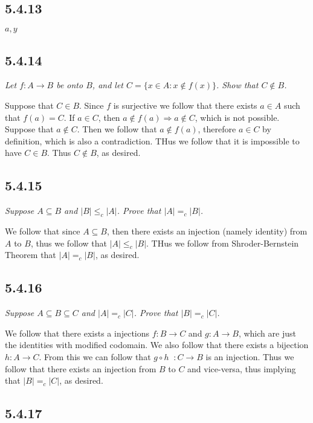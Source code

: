 \documentclass[11pt,oneside,titlepage]{book}
\DeclareMathOperator \inv {^{-1}}
\DeclareMathOperator \ra {\Rightarrow}
\begin{document}
\subsection*{5.4.13}

$a, y$

\subsection*{5.4.14}

\textit{Let $f: A \to B$ be onto $B$, and let $C = \{x \in A: x \notin f(x)\}$. Show that
  $C \notin B$.}

Suppose that $C \in B$. Since $f$ is surjective we follow that there exists $a \in A$
such that $f(a) = C$. If $a \in C$, then $a \notin f(a) \ra a \notin C$, which is not possible.
Suppose that $a \notin C$. Then we follow that $a \notin f(a)$, therefore $a \in C$ by definition,
which is also a contradiction. THus we follow that it is impossible to have $C \in B$. Thus
$C \notin B$, as desired.

\subsection*{5.4.15}

\textit{Suppose $A \subseteq B$ and $|B| \leq_c |A|$. Prove that $|A| =_c |B|$.}

We follow that since $A \subseteq B$, then there exists an injection (namely identity)
from $A$ to $B$, thus we follow that $|A| \leq_c |B|$. THus we follow from
Shroder-Bernstein Theorem that $|A| =_c |B|$, as desired.

\subsection*{5.4.16}

\textit{Suppose $A \subseteq B \subseteq C$ and $|A| =_c |C|$. Prove that $|B| =_c |C|$.}

We follow that there exists a injections $f: B \to C$ and $g: A \to B$, which are
just the identities with modified codomain. We also follow that
there exists a bijection $h: A \to C$. From this we can follow that 
$g \circ h\inv: C \to B$ is an injection. Thus we follow that there exists an injection
from $B$ to $C$ and vice-versa, thus implying that $|B| =_c |C|$, as desired.

\subsection*{5.4.17}
\end{document}
